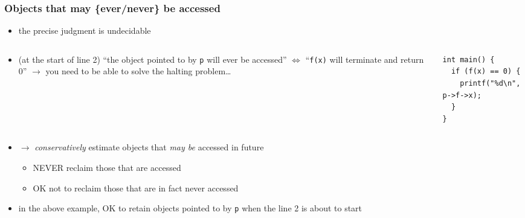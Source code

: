 \documentclass[12pt,dvipdfmx]{beamer}
\newcommand{\ao}[1]{{\color{blue}#1}}
\newcommand{\aka}[1]{{\color{red}#1}}
\begin{document}
\begin{frame}[fragile]
\frametitle{Objects that may \{ever/never\} be accessed}
\begin{itemize}
\item the precise judgment is undecidable
\end{itemize}
\begin{columns}
\begin{column}{0.6\textwidth}
\begin{itemize}
\item (at the start of line 2)
``the object pointed to by {\tt p} will ever be accessed''
$\iff$
``{\tt f(x)} will terminate and return 0''
$\rightarrow$ you need to be able to solve the halting problem\ldots
\end{itemize}
\end{column}

\begin{column}{0.35\textwidth}
\begin{lstlisting}
int main() {
  if (f(x) == 0) {
    printf("%d\n", p->f->x);
  }    
}
\end{lstlisting}
\begin{center}
\end{center}
\end{column}
\end{columns}

\begin{itemize}
\item $\rightarrow$ \ao{\it conservatively}
  estimate objects that \ao{\it may be} accessed in future
  \begin{itemize}
  \item \aka{NEVER} reclaim those that are accessed
  \item \ao{OK} not to reclaim those that are in fact never accessed
  \end{itemize}

\item in the above example, OK to retain objects pointed to by {\tt p}
  when the line 2 is about to start
\end{itemize}
\end{frame}
\fi
\end{document}
